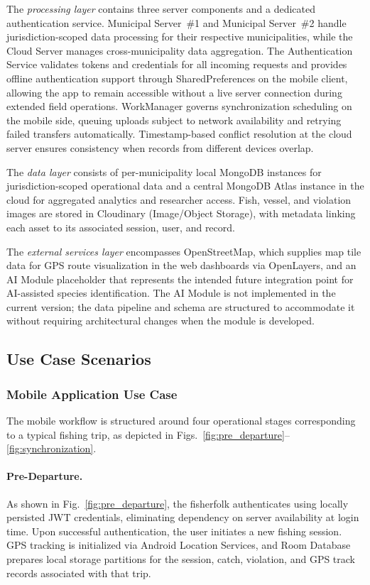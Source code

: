 \documentclass{icsthesis}
\begin{document}
\begin{mainmatter}
The \textit{processing layer} contains three server components and a dedicated
authentication service. Municipal Server~\#1 and Municipal Server~\#2 handle
jurisdiction-scoped data processing for their respective municipalities, while the Cloud
Server manages cross-municipality data aggregation. The Authentication Service validates
tokens and credentials for all incoming requests and provides offline authentication
support through SharedPreferences on the mobile client, allowing the app to
remain accessible without a live server connection during extended field operations.
WorkManager governs synchronization scheduling on the mobile side, queuing uploads
subject to network availability and retrying failed transfers automatically.
Timestamp-based conflict resolution at the cloud server ensures consistency when records
from different devices overlap.

The \textit{data layer} consists of per-municipality local MongoDB instances for
jurisdiction-scoped operational data and a central MongoDB Atlas instance in the cloud
for aggregated analytics and researcher access. Fish, vessel, and violation images are
stored in Cloudinary (Image/Object Storage), with metadata linking each asset to its
associated session, user, and record.

The \textit{external services layer} encompasses OpenStreetMap, which supplies map tile
data for GPS route visualization in the web dashboards via OpenLayers, and an AI Module
placeholder that represents the intended future integration point for AI-assisted species
identification. The AI Module is not implemented in the current version; the data
pipeline and schema are structured to accommodate it without requiring architectural
changes when the module is developed.

\subsection{Use Case Scenarios}

\subsubsection{Mobile Application Use Case}

The mobile workflow is structured around four operational stages corresponding to a
typical fishing trip, as depicted in Figs.~\ref{fig:pre_departure}--\ref{fig:synchronization}.

\paragraph{Pre-Departure.}
As shown in Fig.~\ref{fig:pre_departure}, the fisherfolk authenticates using locally
persisted JWT credentials, eliminating dependency on server availability at login time.
Upon successful authentication, the user initiates a new fishing session. GPS tracking is
initialized via Android Location Services, and Room Database prepares local storage
partitions for the session, catch, violation, and GPS track records associated with that
trip.


\end{mainmatter}
\end{document}
